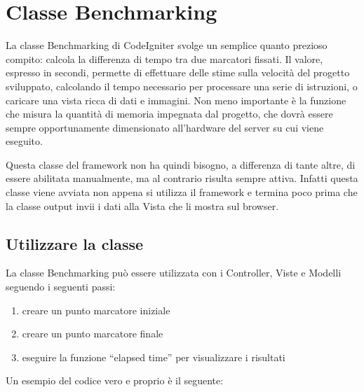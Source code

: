 \section{Classe Benchmarking}
\label{class:benchmark}

La classe Benchmarking di CodeIgniter svolge un semplice quanto prezioso compito: calcola la differenza di tempo tra due marcatori fissati. Il valore, espresso in secondi, permette di effettuare delle stime sulla velocità del progetto sviluppato, calcolando il tempo necessario per processare una serie di istruzioni, o caricare una vista ricca di dati e immagini. Non meno importante è la funzione che misura la quantità di memoria impegnata dal progetto, che dovrà essere sempre opportunamente dimensionato all'hardware del server su cui viene eseguito.

Questa classe del framework non ha quindi bisogno, a differenza di tante altre, di essere abilitata manualmente, ma al contrario risulta sempre attiva. Infatti questa classe viene avviata non appena si utilizza il framework e termina poco prima che la classe output invii i dati alla Vista che li mostra sul browser.

\subsection*{Utilizzare la classe}
La classe Benchmarking può essere utilizzata con i Controller, Viste e Modelli seguendo i seguenti passi:

\begin{enumerate}
\item creare un punto marcatore iniziale
\item creare un punto marcatore finale
\item eseguire la funzione ``elapsed time'' per visualizzare i risultati
\end{enumerate}

Un esempio del codice vero e proprio è il seguente:


